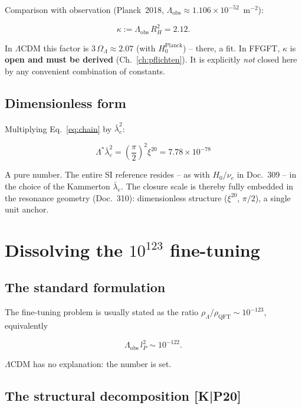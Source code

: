 \documentclass[11pt]{report}
\begin{document}
Comparison with observation (Planck~2018,
$\Lambda_\text{obs} \approx 1.106\times10^{-52}$~m$^{-2}$):

\begin{equation}
  \kappa := \Lambda_\text{obs}\,R_H^{2} = 2.12.
  \label{eq:kappa}
\end{equation}

In $\Lambda$CDM this factor is $3\,\Omega_\Lambda \approx 2.07$
(with $H_0^\text{Planck}$) -- there, a fit. In FFGFT, $\kappa$ is
\textbf{open and must be derived} (Ch.~\ref{ch:pflichten}). It is explicitly
\emph{not} closed here by any convenient combination of constants.

\section{Dimensionless form}

Multiplying Eq.~\eqref{eq:chain} by $\bar\lambda_e^2$:

\begin{equation}
  \boxed{\;\Lambda^{*}\bar\lambda_e^{2}
  = \left(\frac{\pi}{2}\right)^{2}\xi^{20}
  = 7.78\times10^{-78}\;}
  \label{eq:dimless}
\end{equation}

A pure number. The entire SI reference resides -- as with $H_0/\nu_e$
in Doc.~309 -- in the choice of the Kammerton $\bar\lambda_e$. The
closure scale is thereby fully embedded in the resonance geometry
(Doc.~310): dimensionless structure ($\xi^{20}$, $\pi/2$), a single
unit anchor.

\chapter{Dissolving the $10^{123}$ fine-tuning}

\section{The standard formulation}

The fine-tuning problem is usually stated as the ratio
$\rho_\Lambda/\rho_\text{QFT} \sim 10^{-123}$, equivalently

\[
  \Lambda_\text{obs}\,l_P^{2} \sim 10^{-122}.
\]

$\Lambda$CDM has no explanation: the number is set.

\section{The structural decomposition [K|P20]}
\end{document}
